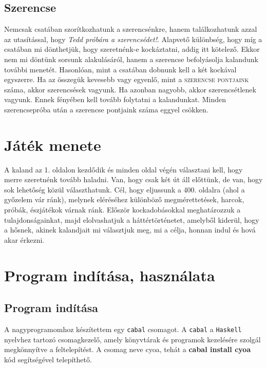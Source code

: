 \documentclass[12pt,a4paper,oneside]{report}
\newcommand{\stat}{\textsc}
\newcommand{\proglang}{\texttt}
\begin{document}
      \subsection{Szerencse}
        Nemcsak csatában szorítkozhatunk a szerencsénkre, hanem
        találkozhatunk azzal az utasítással, hogy \emph{Tedd próbára a
          szerencsédet!}. Alapvető különbség, hogy míg a csatában mi
        dönthetjük, hogy szeretnénk-e kockáztatni, addig itt
        kötelező. Ekkor nem mi döntünk sorsunk alakulásáról, hanem a
        szerencse befolyásolja kalandunk további menetét. Hasonlóan,
        mint a csatában dobnunk kell a két kockával egyszerre. Ha az
        összegük kevesebb vagy egyenlő, mint a \stat{szerencse
          pontjaink} száma, akkor szerencsések vagyunk. Ha azonban
        nagyobb, akkor szerencsétlenek vagyunk. Ennek fényében kell
        tovább folytatni a kalandunkat. Minden szerencsepróba után a
        szerencse pontjaink száma eggyel csökken.
    
      \section{Játék menete}
        A kaland az 1. oldalon kezdődik és minden oldal végén választani kell,
        hogy merre szeretnénk tovább haladni. Van, hogy csak két út áll
        előttünk, de van, hogy sok lehetőség közül választhatunk. Cél, hogy
        eljussunk a 400. oldalra (ahol a győzelem vár ránk), melynek eléréséhez
        különböző megmérettetések, harcok, próbák, észjátékok várnak ránk.
        Először kockadobásokkal meghatározzuk a tulajdonságainkat, majd
        elolvashatjuk a háttértörténetet, amelyből kiderül, hogy a hősnek,
        akinek kalandjait mi választjuk meg, mi a célja, honnan indul és
        hová akar érkezni.
    \section{Program indítása, használata}
      \subsection{Program indítása}
      A nagyprogramomhoz készítettem egy \proglang{cabal} csomagot. A
      \proglang{cabal} a \proglang{Haskell} nyelvhez tartozó csomagkezelő, amely könyvtárak
      és programok kezelésére szolgál megkönnyítve a feltelepítést. A
      csomag neve cyoa, tehát a {\bf cabal install cyoa} kód segítségével
      telepíthető.
\end{document}
